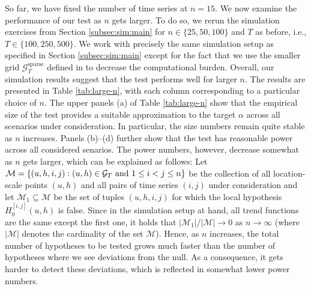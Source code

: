 \documentclass[12pt]{article}
\makeatletter
\renewcommand{\eqref}[1]{\tagform@{\ref{#1}}}
\makeatother
\begin{document}
\begin{table}
{{\begin{subtable}[c]{0.24\textwidth}
\caption{$b=0.75$}

\end{subtable}
\begin{subtable}[c]{0.24\textwidth}
\setcounter{subtable}{0}  
\centering  
\caption*{$n=100$}\vspace{0.1cm} 
\caption{$b=0$}
\vspace{0.25cm}
\caption{$b=0.25$}
\vspace{0.25cm}
\caption{$b=0.5$}
\vspace{0.25cm}
\caption{$b=0.75$}

\end{subtable}}}

\end{table}


So far, we have fixed the number of time series at $n = 15$. We now examine the performance of our test as $n$ gets larger. To do so, we rerun the simulation exercises from Section \ref{subsec:sim:main} for $n \in \{25,50,100\}$ and $T$ as before, i.e., $T \in \{100,250,500\}$. We work with precisely the same simulation setup as specified in Section \ref{subsec:sim:main} except for the fact that we use the smaller grid $\mathcal{G}_T^{\text{sparse}}$ defined in \eqref{eq:grid-sparse} to decrease the computational burden. Overall, our simulation results suggest that the test performs well for larger $n$. The results are presented in Table \ref{tab:large-n}, with each column corresponding to a particular choice of $n$. The upper panels (a) of Table \ref{tab:large-n} show that the empirical size of the test provides a suitable approximation to the target $\alpha$ across all scenarios under consideration. In particular, the size numbers remain quite stable as $n$ increases. Panels (b)--(d) further show that the test has reasonable power across all considered senarios. The power numbers, however, decrease somewhat as $n$ gets larger, which can be explained as follows: Let $\mathcal{M} = \{ (u,h,i,j): (u,h) \in \mathcal{G}_T \text{ and } 1 \le i < j \le n \}$ be the collection of all location-scale points $(u,h)$ and all pairs of time series $(i,j)$ under consideration and let $\mathcal{M}_1 \subseteq \mathcal{M}$ be the set of tuples $(u,h,i,j)$ for which the local hypothesis $H_0^{[i, j]}(u, h)$ is false. Since in the simulation setup at hand, all trend functions are the same except the first one, it holds that $|\mathcal{M}_1| / |\mathcal{M}| \to 0$ as $n \to \infty$ (where $| \mathcal{M} |$ denotes the cardinality of the set $\mathcal{M}$). Hence, as $n$ increases, the total number of hypotheses to be tested grows much faster than the number of hypotheses where we see deviations from the null. As a consequence, it gets harder to detect these deviations, which is reflected in somewhat lower power numbers. 
\end{document}
